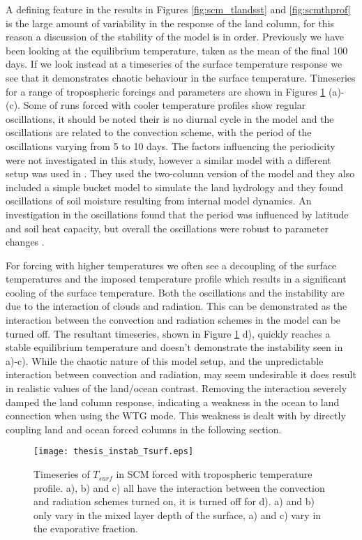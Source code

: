 A defining feature in the results in Figures \ref{fig:scm_tlandsst} and 
\ref{fig:scmthprof} is the large amount of variability in the response of the 
land column, for this reason a discussion of the stability of the model is in 
order. Previously we have been looking at the equilibrium temperature, taken as 
the mean of the final 100 days. If we look instead at a timeseries of the 
surface temperature response we see that it demonstrates chaotic behaviour in 
the surface temperature. Timeseries for a range of tropospheric forcings and 
parameters are shown in Figures \ref{fig:scmts} (a)-(c). Some of runs forced 
with cooler temperature profiles show regular oscillations, it should be noted 
their is no diurnal cycle in the model and the oscillations are related to the 
convection scheme, with the period of the oscillations varying from 5 to 10 
days. The factors influencing the periodicity were not investigated in this 
study, however a similar model with a different setup was used in 
\citet{Abbot2007}.  They used the two-column version of the model and they also 
included a simple bucket model to simulate the land hydrology and they found 
oscillations of soil moisture resulting from internal model dynamics.  An 
investigation in the oscillations found that the period was influenced by 
latitude and soil heat capacity, but overall the oscillations were robust to 
parameter changes \citep{Abbot2007}.

For forcing with higher temperatures we often see a decoupling of the surface 
temperatures and the imposed temperature profile which results in a significant 
cooling of the surface temperature.  Both the oscillations and the instability 
are due to the interaction of clouds and radiation. This can be demonstrated as 
the interaction between the convection and radiation schemes in the model can be 
turned off. The resultant timeseries, shown in Figure \ref{fig:scmts} d), 
quickly reaches a stable equilibrium temperature and doesn't demonstrate the 
instability seen in a)-c). While the chaotic nature of this model setup, and the 
unpredictable interaction between convection and radiation, may seem undesirable 
it does result in realistic values of the land/ocean contrast.  Removing the 
interaction severely damped the land column response, indicating a weakness in 
the ocean to land connection when using the WTG mode.  This weakness is dealt 
with by directly coupling land and ocean forced columns in the following 
section.

\begin{figure}[ht]
\texttt{[image: thesis\_instab\_Tsurf.eps]}
\caption{Timeseries of $T_{surf}$ in SCM forced with tropospheric temperature 
profile. a), b) and c) all have the interaction between the convection and 
radiation schemes turned on, it is turned off for d). a) and b) only vary in the 
mixed layer depth of the surface, a) and c) vary in the evaporative fraction.}
\label{fig:scmts}
\end{figure}

